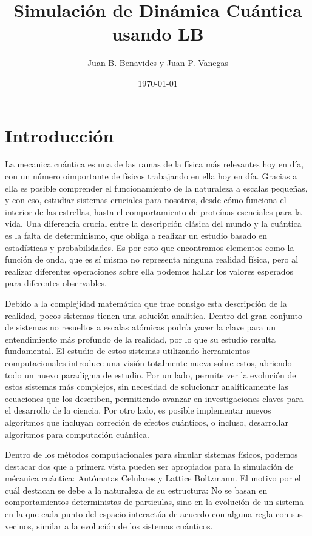 \documentclass[12pts, letterpaper, twocolumn]{article}
\title{Simulación de Dinámica Cuántica usando LB}
\author{Juan B. Benavides y Juan P. Vanegas}
\date{\today}
\begin{document}
\maketitle
\section{Introducción}
La mecanica cuántica es una de las ramas de la física más relevantes hoy en día, con un 
número oimportante de físicos trabajando en ella hoy en día. Gracias a ella es posible 
comprender el funcionamiento de la naturaleza a escalas pequeñas, y con eso, estudiar 
sistemas cruciales para nosotros, desde cómo funciona el interior de las estrellas, hasta 
el comportamiento de proteínas esenciales para la vida. Una diferencia crucial entre la 
descripción clásica del mundo y la cuántica es la falta de determinismo, que obliga a 
realizar un estudio basado en estadísticas y probabilidades. Es por esto que encontramos 
elementos como la función de onda, que es sí misma no representa ninguna realidad física, 
pero al realizar diferentes operaciones sobre ella podemos hallar los valores esperados 
para diferentes observables.

Debido a la complejidad matemática que trae consigo esta descripción de la realidad, pocos 
sistemas tienen una solución analítica. Dentro del gran conjunto de sistemas no resueltos 
a escalas atómicas podría yacer la clave para un entendimiento más profundo de la realidad,
por lo que su estudio resulta fundamental. El estudio de estos sistemas utilizando 
herramientas computacionales introduce una visión totalmente nueva sobre estos, abriendo 
todo un nuevo paradigma de estudio. Por un lado, permite ver la evolución de estos 
sistemas más complejos, sin necesidad de solucionar analíticamente las ecuaciones que los 
describen, permitiendo avanzar en investigaciones claves para el desarrollo de la ciencia. 
Por otro lado, es posible implementar nuevos algoritmos que incluyan correción de efectos 
cuánticos, o incluso, desarrollar algoritmos para computación cuántica.

Dentro de los métodos computacionales para simular sistemas físicos, podemos destacar dos 
que a primera vista pueden ser apropiados para la simulación de mécanica cuántica: 
Autómatas Celulares y Lattice Boltzmann. El motivo por el cuál destacan se debe a la 
naturaleza de su estructura: No se basan en comportamientos deterministas de particulas, 
sino en la evolución de un sistema en la que cada punto del espacio interactúa de acuerdo 
con alguna regla con sus vecinos, similar a la evolución de los sistemas cuánticos.
\end{document}
